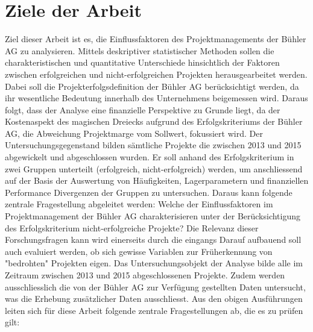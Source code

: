 \section{Ziele der Arbeit}\label{sec:zda}
Ziel dieser Arbeit ist es, die Einflussfaktoren des Projektmanagements der Bühler AG zu analysieren. Mittels deskriptiver statistischer Methoden sollen die charakteristischen und quantitative Unterschiede hinsichtlich der Faktoren zwischen erfolgreichen und nicht-erfolgreichen Projekten herausgearbeitet werden. Dabei soll die Projekterfolgsdefinition der Bühler AG berücksichtigt werden, da ihr wesentliche Bedeutung innerhalb des Unternehmens beigemessen wird. Daraus folgt, dass der Analyse eine finanzielle Perspektive zu Grunde liegt, da der Kostenaspekt des magischen Dreiecks aufgrund des Erfolgskriteriums der Bühler AG, die Abweichung Projektmarge vom Sollwert, fokussiert wird. Der Untersuchungsgegenstand bilden sämtliche Projekte die zwischen 2013 und 2015 abgewickelt und abgeschlossen wurden. Er soll anhand des Erfolgskriterium in zwei Gruppen unterteilt (erfolgreich, nicht-erfolgreich) werden, um anschliessend auf der Basis der Auswertung von  Häufigkeiten, Lagerparametern und finanziellen Performance Divergenzen der Gruppen zu untersuchen. Daraus kann folgende zentrale Fragestellung abgeleitet werden: 
\newline\newline
Welche der Einflussfaktoren im Projektmanagement der Bühler AG charakterisieren unter der Berücksichtigung des Erfolgskriterium \glqq nicht-erfolgreiche\grqq{ } Projekte?
\newline\newline
Die Relevanz dieser Forschungsfragen kann  wird einerseits durch die eingangs 
Darauf aufbauend soll auch evaluiert werden, ob sich gewisse Variablen zur Früherkennung von "bedrohten" Projekten eigen. Das Untersuchungsobjekt der Analyse bilde alle im Zeitraum zwischen 2013 und 2015 abgeschlossenen Projekte. Zudem werden ausschliesslich die von der Bühler AG zur Verfügung gestellten Daten untersucht, was die Erhebung zusätzlicher Daten ausschliesst. Aus den obigen Ausführungen leiten sich für diese Arbeit folgende zentrale Fragestellungen ab, die es zu prüfen gilt:

